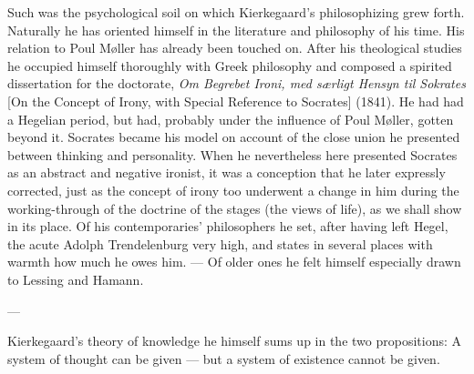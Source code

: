 \documentclass[12pt,a4paper]{book}
\newcommand{\opage}[1]{\marginnote{\footnotesize\textit{[#1]}}}
\begin{document}
Such was the psychological soil on which Kierkegaard's philosophizing grew forth. Naturally
he has oriented himself in the literature and philosophy of his time. His relation to Poul
Møller has already been touched on. After his theological studies \opage{151}he occupied himself
thoroughly with Greek philosophy and composed a spirited dissertation for the doctorate,
\emph{Om Begrebet Ironi, med særligt Hensyn til Sokrates} [On the Concept of Irony, with
Special Reference to Socrates] (1841). He had had a Hegelian period, but had, probably under
the influence of Poul Møller, gotten beyond it. Socrates became his model on account of the
close union he presented between thinking and personality. When he nevertheless here
presented Socrates as an abstract and negative ironist, it was a conception that he later
expressly corrected, just as the concept of irony too underwent a change in him during the
working-through of the doctrine of the stages (the views of life), as we shall show in its
place. Of his contemporaries' philosophers he set, after having left Hegel, the acute Adolph
Trendelenburg very high, and states in several places with warmth how much he owes him. ---
Of older ones he felt himself especially drawn to Lessing and Hamann.

\begin{center}---\end{center}

Kierkegaard's theory of knowledge he himself sums up in the two propositions: A system of
thought can be given --- but a system of existence cannot be given.
\end{document}
